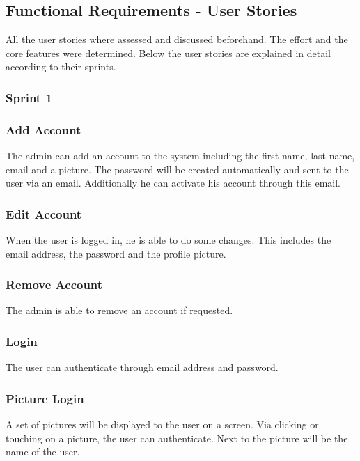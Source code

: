\subsection{Functional Requirements - User Stories}\label{functional-requirements---userstories}

All the user stories where assessed and discussed beforehand. The effort
and the core features were determined. Below the user stories are
explained in detail according to their sprints.

\subsubsection{Sprint 1}\label{sprint-1}

\subsubsection*{Add Account}

The admin can add an account to the system including the first name,
last name, email and a picture. The password will be created
automatically and sent to the user via an email. Additionally he can
activate his account through this email.

\subsubsection*{Edit Account}

When the user is logged in, he is able to do some changes. This includes
the email address, the password and the profile picture.

\subsubsection*{Remove Account}

The admin is able to remove an account if requested.

\subsubsection*{Login}

The user can authenticate through email address and password.

\subsubsection*{Picture Login}

A set of pictures will be displayed to the user on a screen. Via
clicking or touching on a picture, the user can authenticate. Next to
the picture will be the name of the user.

